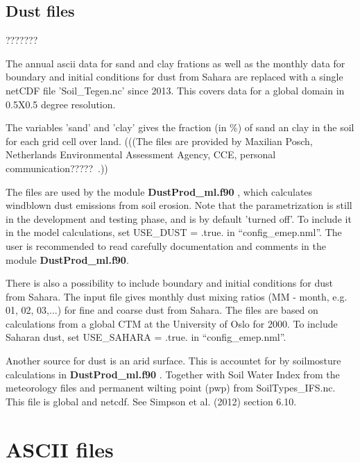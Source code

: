 \subsection{Dust files}???????

The annual ascii data for sand and clay frations as well as the monthly data for boundary and initial conditions for dust from Sahara are replaced with a single netCDF file 'Soil\_Tegen.nc' since 2013.   This covers data for a global domain in 0.5X0.5 degree resolution.  

The variables 'sand' and 'clay' gives the fraction (in \%)  
of sand an clay in the soil for each grid cell over land. (((The files are provided by 
Maxilian Posch, Netherlands Environmental Assessment Agency, CCE, personal communication????? .)) 


The files are used by the module {\bf DustProd\_ml.f90 }, which calculates windblown dust 
emissions from soil erosion. Note that the parametrization is still in the development and 
testing phase, and is by default 'turned off'. To include it in the model calculations, set 
USE\_DUST = .true. in ``config\_emep.nml''.
The user is recommended to read carefully documentation and
comments in the module {\bf DustProd\_ml.f90}.

There is also a possibility to include boundary and initial conditions for dust from Sahara. 
The input file gives monthly dust mixing 
ratios (MM - month, e.g. 01, 02, 03,...) for fine and coarse dust from Sahara. The files are based on calculations 
from a global CTM at the University of Oslo for 2000. 
To include Saharan dust, set USE\_SAHARA = .true. in ``config\_emep.nml''.

Another source for dust is an arid surface. This is accountet for by soilmosture calculations in {\bf DustProd\_ml.f90 }. 
Together with Soil Water Index from the meteorology files and permanent wilting point (pwp) from SoilTypes\_IFS.nc. 
This file is global and netcdf. See Simpson et al. (2012) section 6.10.



\section{ASCII files}


% 
% 
% 
% 



